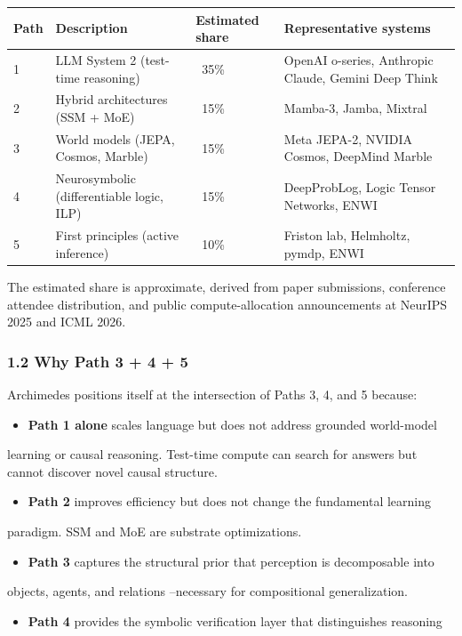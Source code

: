 \documentclass[11pt]{article}
\begin{document}
\begin{tabular}{llll}
Path & Description & Estimated share & Representative systems \\
\hline
1 & LLM System 2 (test-time reasoning) & ~35\% & OpenAI o-series, Anthropic Claude, Gemini Deep Think \\
2 & Hybrid architectures (SSM + MoE) & ~15\% & Mamba-3, Jamba, Mixtral \\
3 & World models (JEPA, Cosmos, Marble) & ~15\% & Meta JEPA-2, NVIDIA Cosmos, DeepMind Marble \\
4 & Neurosymbolic (differentiable logic, ILP) & ~15\% & DeepProbLog, Logic Tensor Networks, ENWI \\
5 & First principles (active inference) & ~10\% & Friston lab, Helmholtz, pymdp, ENWI \\
\end{tabular}


The estimated share is approximate, derived from paper submissions, conference
attendee distribution, and public compute-allocation announcements at NeurIPS 2025
and ICML 2026.

\subsubsection{1.2 Why Path 3 + 4 + 5}

Archimedes positions itself at the intersection of Paths 3, 4, and 5 because:

\begin{itemize}
  \item \textbf{Path 1 alone} scales language but does not address grounded world-model
\end{itemize}

  learning or causal reasoning. Test-time compute can search for answers but cannot
  discover novel causal structure.
\begin{itemize}
  \item \textbf{Path 2} improves efficiency but does not change the fundamental learning
\end{itemize}

  paradigm. SSM and MoE are substrate optimizations.
\begin{itemize}
  \item \textbf{Path 3} captures the structural prior that perception is decomposable into
\end{itemize}

  objects, agents, and relations --necessary for compositional generalization.
\begin{itemize}
  \item \textbf{Path 4} provides the symbolic verification layer that distinguishes reasoning
\end{itemize}
\end{document}
